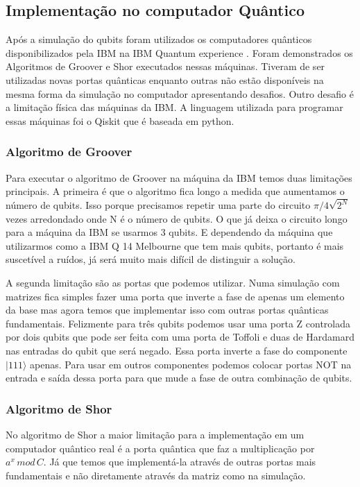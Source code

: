 \documentclass[12pt,a4paper]{article}
\begin{document}
 


\subsection{Implementação no computador Quântico}
Após a simulação do qubits foram utilizados os computadores quânticos disponibilizados pela IBM na IBM Quantum experience \cite{IBM2019IBMExperience}. Foram demonstrados os Algoritmos de Groover e Shor executados nessas máquinas. Tiveram de ser utilizadas novas portas quânticas enquanto outras não estão disponíveis na mesma forma da simulação no computador apresentando desafios. Outro desafio é a limitação física das máquinas da IBM.  A linguagem utilizada para programar essas máquinas foi o Qiskit que é baseada em python. 

\subsubsection{Algoritmo de Groover}
Para executar o algoritmo de Groover na máquina da IBM temos duas limitações principais. A primeira é que o algoritmo fica longo a medida que aumentamos o número de qubits. Isso porque precisamos repetir uma parte do circuito $\pi/4\sqrt{2^N}$ vezes arredondado onde N é o número de qubits. O que já deixa o circuito longo para a máquina da IBM se usarmos 3 qubits.  E dependendo da máquina que utilizarmos como a IBM Q 14 Melbourne que tem mais qubits,  portanto é mais suscetível a ruídos, já será muito mais difícil de distinguir a solução. 

A segunda limitação são as portas que podemos utilizar. Numa simulação com matrizes fica simples fazer uma porta que inverte a fase de apenas um elemento da base mas agora temos que implementar isso com outras portas quânticas fundamentais. Felizmente para três qubits podemos usar uma porta Z controlada por dois qubits que pode ser feita com uma porta de Toffoli e duas de Hardamard nas entradas do qubit que será negado. Essa porta inverte a fase do componente $|111\rangle$ apenas. Para usar em outros componentes podemos colocar portas NOT na entrada e saída dessa porta para que mude a fase de outra combinação de qubits. 

\subsubsection{Algoritmo de Shor}
No algoritmo de Shor a maior limitação para a implementação em um computador quântico real é a porta quântica que faz a multiplicação por $a^x\,mod\,C$. Já que temos que implementá-la através de outras portas mais fundamentais e não diretamente através da matriz como na simulação. 
\end{document}
